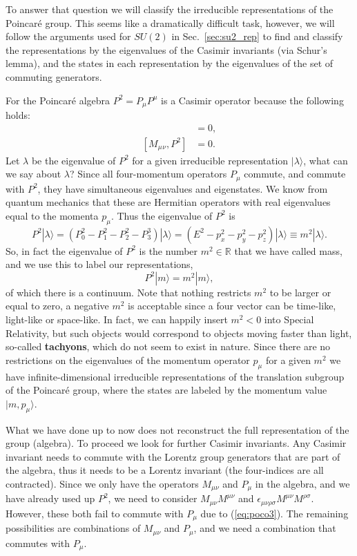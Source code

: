 \documentclass[notes.tex]{subfiles}
\begin{document}
To answer that question we will classify the irreducible representations of the Poincaré group. This seems like a dramatically difficult task, however, we will follow the arguments used for $SU(2)$ in Sec.~\ref{sec:su2_rep} to find and classify the representations by the eigenvalues of the Casimir invariants (via Schur's lemma), and the states in each representation by the eigenvalues of the set of commuting generators.

For the Poincaré algebra $P^2 = P_\mu P^\mu$ is a Casimir operator because the following holds:
\begin{align}
[P_\mu, P^2] &= 0,\\
[M_\mu{}_{\nu}, P^2]& = 0.
\end{align}
Let $\lambda$ be the eigenvalue of $P^2$ for a given irreducible representation  $|\lambda\rangle$, what can we say about $\lambda$? Since all four-momentum operators $P_\mu$ commute, and commute with $P^2$, they have simultaneous eigenvalues and eigenstates. We know from quantum mechanics that these are Hermitian operators with real eigenvalues equal to the momenta $p_\mu$. Thus the eigenvalue of $P^2$ is
\[P^2|\lambda \rangle = (P_0^2-P_1^2-P_2^2-P_3^3)|\lambda \rangle = (E^2-p_x^2-p_y^2-p_z^2)|\lambda\rangle \equiv m^2 |\lambda\rangle. \]
So, in fact the eigenvalue of $P^2$ is the number $m^2\in\mathbb R$ that we have called mass, and we use this to label our representations, 
\[P^2|m\rangle = m^2 |m\rangle,\]
of which there is a continuum. Note that nothing restricts $m^2$ to be larger or equal to zero, a negative $m^2$ is acceptable since a four vector can be time-like, light-like or space-like. In fact, we can happily insert $m^2<0$ into Special Relativity, but such objects would correspond to objects moving faster than light, so-called {\bf tachyons}, which do not seem to exist in nature. Since there are no restrictions on the eigenvalues of the momentum operator $p_\mu$ for a given $m^2$ we have infinite-dimensional irreducible representations of the translation subgroup of the Poincaré group, where the states are labeled by the momentum value $ |m, p_\mu\rangle$.

What we have done up to now does not reconstruct the full representation of the group (algebra). To proceed we look for further Casimir invariants. Any Casimir invariant needs to commute with the Lorentz group generators that are part of the algebra, thus it needs to be a Lorentz invariant (the four-indices are all contracted). Since we only have the operators $M_{\mu\nu}$ and $P_\mu$ in the algebra, and we have already used up $P^2$, we need to consider $M_{\mu\nu}M^{\mu\nu}$ and $\epsilon_{\mu\nu\rho\sigma}M^{\mu\nu}M^{\rho\sigma}$. However, these both fail to commute with $P_\mu$ due to (\ref{eq:poco3}). The remaining possibilities are combinations of $M_{\mu\nu}$ and $P_\mu$, and we need a combination that commutes with $P_\mu$.
\end{document}
